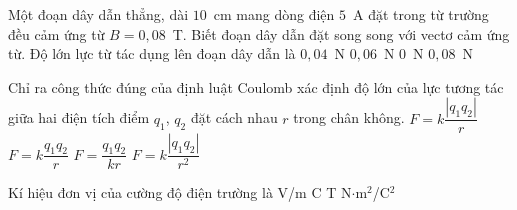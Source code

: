 	\begin{ex}%
		Một đoạn dây dẫn thẳng, dài $10$~cm mang dòng điện $5$~A đặt trong từ trường đều cảm ứng từ $B=0{,}08$~T. Biết đoạn dây dẫn đặt song song với vectơ cảm ứng từ. Độ lớn lực từ tác dụng lên đoạn dây dẫn là
		\choice
		{$0{,}04$~N}
		{$0{,}06$~N}
		{\True $0$~N}
		{$0{,}08$~N}
	\end{ex}

	\begin{ex}%
		Chỉ ra công thức đúng của định luật Coulomb xác định độ lớn của lực tương tác giữa hai điện tích điểm $q_1$, $q_2$ đặt cách nhau $r$ trong chân không.
		\choice
		{$F=k\dfrac{|q_1q_2|}{r}$}
		{$F=k\dfrac{q_1q_2}{r}$}
		{$F=\dfrac{q_1q_2}{kr}$}
		{\True $F=k\dfrac{|q_1q_2|}{r^2}$}
	\end{ex}

	\begin{ex}%
		Kí hiệu đơn vị của cường độ điện trường là
		\choice
		{\True V/m}
		{C}
		{T}
		{N$\cdot$m$^2$/C$^2$}
	\end{ex}

